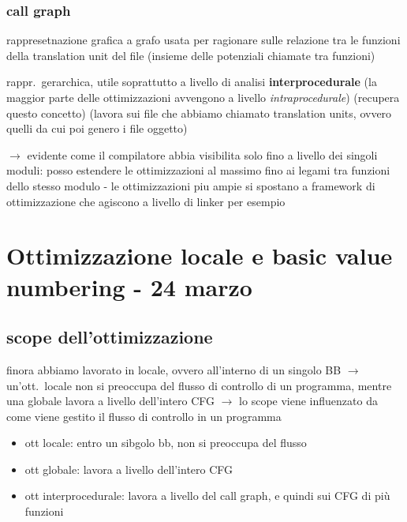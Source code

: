 \subsubsection{call graph}

rappresetnazione grafica a grafo usata per ragionare sulle relazione tra le funzioni della translation unit del file (insieme delle potenziali chiamate tra funzioni)

rappr.~gerarchica, utile soprattutto a livello di analisi \textbf{interprocedurale} (la maggior parte delle ottimizzazioni avvengono a livello \textit{intraprocedurale}) (recupera questo concetto) (lavora sui file che abbiamo chiamato translation units, ovvero quelli da cui poi genero i file oggetto)

$\rightarrow$ evidente come il compilatore abbia visibilita solo fino a livello dei singoli moduli: posso estendere le ottimizzazioni al massimo fino ai legami tra funzioni dello stesso modulo - le ottimizzazioni piu ampie si spostano a framework di ottimizzazione che agiscono a livello di linker per esempio

\section{Ottimizzazione locale e basic value numbering - 24 marzo}

\subsection{scope dell'ottimizzazione}

finora abbiamo lavorato in locale, ovvero all'interno di un singolo BB $\rightarrow$ un'ott.~locale non si preoccupa del flusso di controllo di un programma, mentre una globale lavora a livello dell'intero CFG $\rightarrow$ lo scope viene influenzato da come viene gestito il flusso di controllo in un programma

\begin{itemize}
  \item ott locale: entro un sibgolo bb, non si preoccupa del flusso
  \item ott globale: lavora a livello dell'intero CFG
  \item ott interprocedurale: lavora a livello del call graph, e quindi sui CFG di pi\`u funzioni
\end{itemize}

